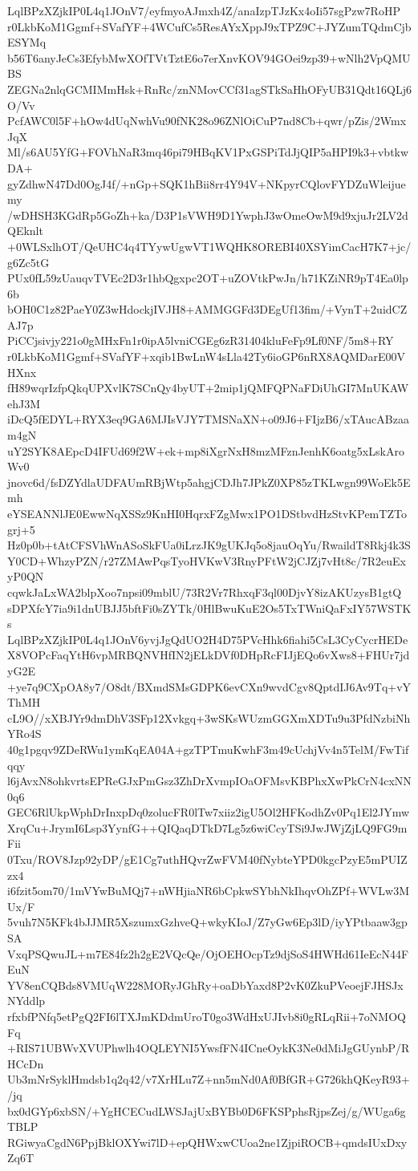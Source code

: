 LqlBPzXZjkIP0L4q1JOnV7/eyfmyoAJmxh4Z/anaIzpTJzKx4oIi57sgPzw7RoHP
r0LkbKoM1Ggmf+SVafYF+4WCufCs5ResAYxXppJ9xTPZ9C+JYZumTQdmCjbESYMq
b56T6anyJeCs3EfybMwXOfTVtTztE6o7erXnvKOV94GOei9zp39+wNlh2VpQMUBS
ZEGNa2nlqGCMIMmHsk+RnRc/znNMovCCf31agSTkSaHhOFyUB31Qdt16QLj6O/Vv
PcfAWC0l5F+hOw4dUqNwhVu90fNK28o96ZNlOiCuP7nd8Cb+qwr/pZis/2WmxJqX
Ml/s6AU5YfG+FOVhNaR3mq46pi79HBqKV1PxGSPiTdJjQIP5aHPI9k3+vbtkwDA+
gyZdhwN47Dd0OgJ4f/+nGp+SQK1hBii8rr4Y94V+NKpyrCQlovFYDZuWleijuemy
/wDHSH3KGdRp5GoZh+ka/D3P1sVWH9D1YwphJ3wOmeOwM9d9xjuJr2LV2dQEknlt
+0WLSxlhOT/QeUHC4q4TYywUgwVT1WQHK8OREBI40XSYimCacH7K7+jc/g6Zc5tG
PUx0fL59zUauqvTVEc2D3r1hbQgxpc2OT+uZOVtkPwJn/h71KZiNR9pT4Ea0lp6b
bOH0C1z82PaeY0Z3wHdockjIVJH8+AMMGGFd3DEgUf13fim/+VynT+2uidCZAJ7p
PiCCjsivjy221o0gMHxFn1r0ipA5lvniCGEg6zR31404kluFeFp9Lf0NF/5m8+RY
r0LkbKoM1Ggmf+SVafYF+xqib1BwLnW4sLla42Ty6ioGP6nRX8AQMDarE00VHXnx
fH89wqrIzfpQkqUPXvlK7SCnQy4byUT+2mip1jQMFQPNaFDiUhGI7MnUKAWehJ3M
iDcQ5fEDYL+RYX3eq9GA6MJIsVJY7TMSNaXN+o09J6+FIjzB6/xTAucABzaam4gN
uY2SYK8AEpcD4IFUd69f2W+ek+mp8iXgrNxH8mzMFznJenhK6oatg5xLskAroWv0
jnovc6d/fsDZYdlaUDFAUmRBjWtp5ahgjCDJh7JPkZ0XP85zTKLwgn99WoEk5Emh
eYSEANNlJE0EwwNqXSSz9KnHI0HqrxFZgMwx1PO1DStbvdHzStvKPemTZTogrj+5
Hz0p0b+tAtCFSVhWnASoSkFUa0iLrzJK9gUKJq5o8jauOqYu/RwaildT8Rkj4k3S
Y0CD+WhzyPZN/r27ZMAwPqsTyoHVKwV3RnyPFtW2jCJZj7vHt8c/7R2euExyP0QN
cqwkJaLxWA2blpXoo7npsi09mblU/73R2Vr7RhxqF3ql00DjvY8izAKUzysB1gtQ
sDPXfcY7ia9i1dnUBJJ5bftFi0sZYTk/0HlBwuKuE2Os5TxTWniQaFxIY57WSTKs
LqlBPzXZjkIP0L4q1JOnV6yvjJgQdUO2H4D75PVcHhk6fiahi5CsL3CyCycrHEDe
X8VOPcFaqYtH6vpMRBQNVHfIN2jELkDVf0DHpRcFIJjEQo6vXws8+FHUr7jdyG2E
+ye7q9CXpOA8y7/O8dt/BXmdSMsGDPK6evCXn9wvdCgv8QptdIJ6Av9Tq+vYThMH
cL9O//xXBJYr9dmDhV3SFp12Xvkgq+3wSKsWUzmGGXmXDTu9u3PfdNzbiNhYRo4S
40g1pgqv9ZDeRWu1ymKqEA04A+gzTPTmuKwhF3m49cUchjVv4n5TelM/FwTifqqy
l6jAvxN8ohkvrtsEPReGJxPmGsz3ZhDrXvmpIOaOFMsvKBPhxXwPkCrN4cxNN0q6
GEC6RlUkpWphDrInxpDq0zolucFR0lTw7xiiz2igU5Ol2HFKodhZv0Pq1El2JYmw
XrqCu+JrymI6Lsp3YynfG++QIQaqDTkD7Lg5z6wiCcyTSi9JwJWjZjLQ9FG9mFii
0Txu/ROV8Jzp92yDP/gE1Cg7uthHQvrZwFVM40fNybteYPD0kgcPzyE5mPUIZzx4
i6fzit5om70/1mVYwBuMQj7+nWHjiaNR6bCpkwSYbhNkIhqvOhZPf+WVLw3MUx/F
5vuh7N5KFk4bJJMR5XszumxGzhveQ+wkyKIoJ/Z7yGw6Ep3lD/iyYPtbaaw3gpSA
VxqPSQwuJL+m7E84fz2h2gE2VQcQe/OjOEHOcpTz9djSoS4HWHd61IeEcN44FEuN
YV8enCQBds8VMUqW228MORyJGhRy+oaDbYaxd8P2vK0ZkuPVeoejFJHSJxNYddlp
rfxbfPNfq5etPgQ2FI6lTXJmKDdmUroT0go3WdHxUJIvb8i0gRLqRii+7oNMOQFq
+RIS71UBWvXVUPhwlh4OQLEYNI5YwsfFN4ICneOykK3Ne0dMiJgGUynbP/RHCcDn
Ub3mNrSyklHmdsb1q2q42/v7XrHLu7Z+nn5mNd0Af0BfGR+G726khQKeyR93+/jq
bx0dGYp6xbSN/+YgHCECudLWSJajUxBYBb0D6FKSPphsRjpsZej/g/WUga6gTBLP
RGiwyaCgdN6PpjBklOXYwi7lD+epQHWxwCUoa2ne1ZjpiROCB+qmdsIUxDxyZq6T
